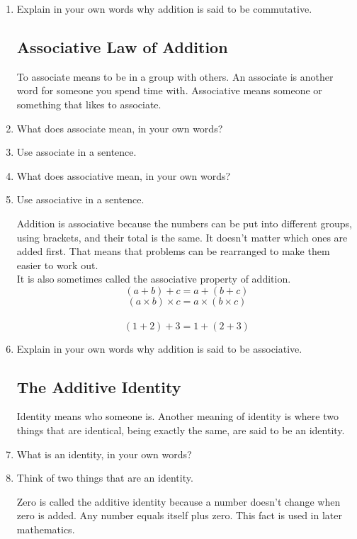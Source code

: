 \documentclass[12pt]{article}
\begin{document}
\begin{enumerate}
\item Explain in your own words why addition is said to be commutative.

\subsection*{Associative Law of Addition}
To associate means to be in a group with others. An associate is another word for someone you spend time with. Associative means someone or something that likes to associate.\\

\item What does associate mean, in your own words?
\item Use associate in a sentence.
\item What does associative mean, in your own words?
\item Use associative in a sentence.

Addition is associative because the numbers can be put into different groups, using brackets, and their total is the same. It doesn't matter which ones are added first. That means that problems can be rearranged to make them easier to work out.\\

It is also sometimes called the associative property of addition.\\

$$(a + b) + c  =  a + (b + c)$$
$$(a \times b) \times c  =  a \times (b \times c)$$\\

$$(1+2)+3=1+(2+3)$$

\item Explain in your own words why addition is said to be associative.

\subsection*{The Additive Identity}
Identity means who someone is. Another meaning of identity is where two things that are identical, being exactly the same, are said to be an identity.\\

\item What is an identity, in your own words?
\item Think of two things that are an identity.

Zero is called the additive identity because a number doesn’t change when zero is added. Any number equals itself plus zero. This fact is used in later mathematics.


\end{enumerate}
\end{document}
